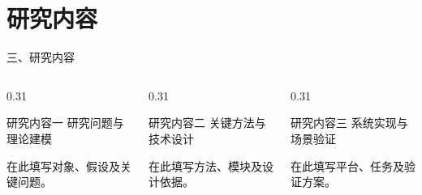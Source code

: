 \documentclass[10pt,aspectratio=169]{beamer}
\begin{document}
\section{研究内容}
\begin{frame}{三、研究内容}
  \begin{columns}[T,onlytextwidth]
    \begin{column}{0.31\textwidth}
      \begin{block}{研究内容一}
        \vspace{0.3em}
        研究问题与理论建模\par\medskip
        \textcolor{PCLMuted}{在此填写对象、假设及关键问题。}
        \vspace{0.3em}
      \end{block}
    \end{column}
    \begin{column}{0.31\textwidth}
      \begin{block}{研究内容二}
        \vspace{0.3em}
        关键方法与技术设计\par\medskip
        \textcolor{PCLMuted}{在此填写方法、模块及设计依据。}
        \vspace{0.3em}
      \end{block}
    \end{column}
    \begin{column}{0.31\textwidth}
      \begin{block}{研究内容三}
        \vspace{0.3em}
        系统实现与场景验证\par\medskip
        \textcolor{PCLMuted}{在此填写平台、任务及验证方案。}
        \vspace{0.3em}
      \end{block}
    \end{column}
  \end{columns}
  \vspace{0.7cm}
\end{frame}
\end{document}
